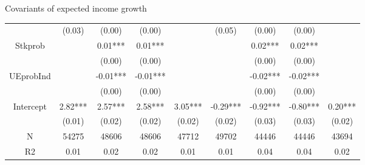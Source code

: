 \documentclass{beamer}
\begin{document}
\begin{frame}{Covariants of expected income growth}
\begin{table}
{\begin{tabular}{ccccccccc}
				&    (0.03) &    (0.00) &     (0.00) &             &    (0.05) &     (0.00) &      (0.00) &              \\
				Stkprob          &           &   0.01*** &    0.01*** &             &           &    0.02*** &     0.02*** &              \\
				&           &    (0.00) &     (0.00) &             &           &     (0.00) &      (0.00) &              \\
				UEprobInd        &           &  -0.01*** &   -0.01*** &             &           &   -0.02*** &    -0.02*** &              \\
				&           &    (0.00) &     (0.00) &             &           &     (0.00) &      (0.00) &              \\
				Intercept        &   2.82*** &   2.57*** &    2.58*** &     3.05*** &  -0.29*** &   -0.92*** &    -0.80*** &      0.20*** \\
				&    (0.01) &    (0.02) &     (0.02) &      (0.02) &    (0.02) &     (0.03) &      (0.03) &       (0.02) \\
				\hline 
				N                &     54275 &     48606 &      48606 &       47712 &     49702 &      44446 &       44446 &        43694 \\
				R2               &      0.01 &      0.02 &       0.02 &        0.01 &      0.01 &       0.04 &        0.04 &         0.02 \\
				
				\hline 
			\end{tabular}
		}
	\end{table}
\end{frame}
\end{document}
